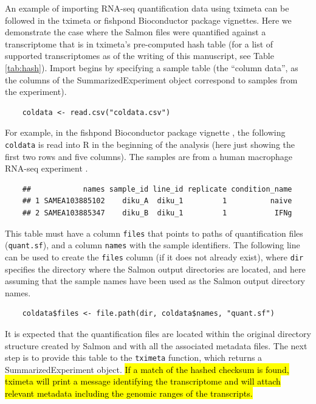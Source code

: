 An example of importing RNA-seq quantification data using tximeta can
be followed in the tximeta or fishpond Bioconductor package
vignettes. Here we demonstrate the case where the Salmon files were
quantified against a transcriptome that is in tximeta's pre-computed
hash table (for a list of supported transcriptomes as of the writing
of this manuscript, see Table \ref{tab:hash}). Import begins by specifying
a sample table (the ``column data'', as the columns of the
SummarizedExperiment object correspond to samples from the
experiment).

\begin{verbatim}
    coldata <- read.csv("coldata.csv")
\end{verbatim}

For example, in the fishpond Bioconductor package vignette \cite{swish}, the
following \texttt{coldata} is read into R in the beginning of the
analysis (here just showing the first two rows and five columns). The
samples are from a human macrophage RNA-seq experiment \cite{alasoo}.

\begin{verbatim}
    ##            names sample_id line_id replicate condition_name
    ## 1 SAMEA103885102    diku_A  diku_1         1          naive
    ## 2 SAMEA103885347    diku_B  diku_1         1           IFNg
\end{verbatim}

This table must have a column \texttt{files} that points to paths of
quantification files (\texttt{quant.sf}), and a column \texttt{names} with the sample
identifiers. The following line can be used to create the
\texttt{files} column (if it does not already exist), where \texttt{dir}
specifies the directory where the Salmon output directories are
located, and here assuming that the sample names have been used as the
Salmon output directory names. 

\begin{verbatim}
    coldata$files <- file.path(dir, coldata$names, "quant.sf")
\end{verbatim}

It is expected that the quantification files are located
within the original directory structure created by Salmon and with all
the associated metadata files. The next
step is to provide this table to the \texttt{tximeta} function, which
returns a SummarizedExperiment object. \hl{If a match of the hashed
checksum is found, tximeta will print a message identifying the
transcriptome and will attach relevant metadata including the genomic
ranges of the transcripts.}

